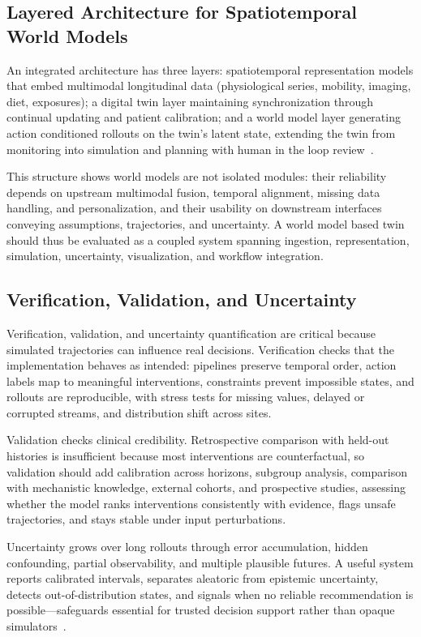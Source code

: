\documentclass[journal]{IEEEtran}
\begin{document}
\subsection{Layered Architecture for Spatiotemporal World Models}
An integrated architecture has three layers: spatiotemporal representation models that embed multimodal longitudinal data (physiological series, mobility, imaging, diet, exposures); a digital twin layer maintaining synchronization through continual updating and patient calibration; and a world model layer generating action conditioned rollouts on the twin's latent state, extending the twin from monitoring into simulation and planning with human in the loop review~\cite{Sadee2025MedicalDT}.

This structure shows world models are not isolated modules: their reliability depends on upstream multimodal fusion, temporal alignment, missing data handling, and personalization, and their usability on downstream interfaces conveying assumptions, trajectories, and uncertainty. A world model based twin should thus be evaluated as a coupled system spanning ingestion, representation, simulation, uncertainty, visualization, and workflow integration.

\subsection{Verification, Validation, and Uncertainty}
Verification, validation, and uncertainty quantification are critical because simulated trajectories can influence real decisions. Verification checks that the implementation behaves as intended: pipelines preserve temporal order, action labels map to meaningful interventions, constraints prevent impossible states, and rollouts are reproducible, with stress tests for missing values, delayed or corrupted streams, and distribution shift across sites.

Validation checks clinical credibility. Retrospective comparison with held-out histories is insufficient because most interventions are counterfactual, so validation should add calibration across horizons, subgroup analysis, comparison with mechanistic knowledge, external cohorts, and prospective studies, assessing whether the model ranks interventions consistently with evidence, flags unsafe trajectories, and stays stable under input perturbations.

Uncertainty grows over long rollouts through error accumulation, hidden confounding, partial observability, and multiple plausible futures. A useful system reports calibrated intervals, separates aleatoric from epistemic uncertainty, detects out-of-distribution states, and signals when no reliable recommendation is possible---safeguards essential for trusted decision support rather than opaque simulators~\cite{Sel2025VVUQ}.
\end{document}
